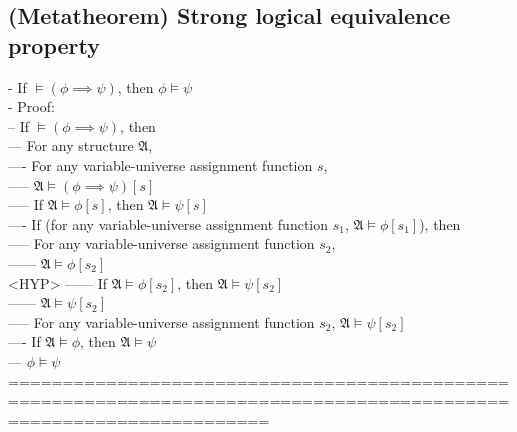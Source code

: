 \documentclass{book}
\begin{document}
\subsection{(Metatheorem) Strong logical equivalence property} %
	- If $\vDash (\phi \implies \psi)$, then $\phi \vDash \psi$ \\
	- Proof: \\
		-- If $\vDash (\phi \implies \psi)$, then \\
			--- For any structure $\mathfrak{A}$, \\
				---- For any variable-universe assignment function $s$, \\
					----- $\mathfrak{A} \vDash (\phi \implies \psi)[s]$ \\
					----- If $\mathfrak{A} \vDash \phi[s]$, then $\mathfrak{A} \vDash \psi[s]$ \\
				---- If (for any variable-universe assignment function $s_1$, $\mathfrak{A} \vDash \phi[s_1]$), then \\
					----- For any variable-universe assignment function $s_2$, \\
						------ $\mathfrak{A} \vDash \phi[s_2]$ \\ <HYP>
						------ If $\mathfrak{A} \vDash \phi[s_2]$, then $\mathfrak{A} \vDash \psi[s_2]$ \\
						------ $\mathfrak{A} \vDash \psi[s_2]$ \\
					----- For any variable-universe assignment function $s_2$, $\mathfrak{A} \vDash \psi[s_2]$ \\
				---- If $\mathfrak{A} \vDash \phi$, then $\mathfrak{A} \vDash \psi$ \\
			--- $\phi \vDash \psi$ \\
	====================================================================================================================
\end{document}
